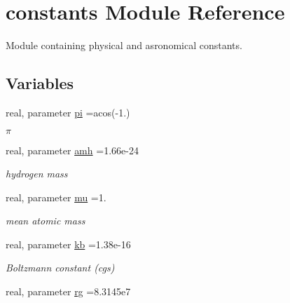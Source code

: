 \hypertarget{namespaceconstants}{}\section{constants Module Reference}
\label{namespaceconstants}


Module containing physical and asronomical constants.  


\subsection*{Variables}
\begin{DoxyCompactItemize}
\item 
\hypertarget{namespaceconstants_a815ad954ef712211ed1b1fdb8be42487}{}real, parameter \hyperlink{namespaceconstants_a815ad954ef712211ed1b1fdb8be42487}{pi} =acos(-\/1.)\label{namespaceconstants_a815ad954ef712211ed1b1fdb8be42487}

\begin{DoxyCompactList}\small\item\em $ \pi $ \end{DoxyCompactList}\item 
\hypertarget{namespaceconstants_aac258d92ad409a5ad7f8748101e932b0}{}real, parameter \hyperlink{namespaceconstants_aac258d92ad409a5ad7f8748101e932b0}{amh} =1.\+66e-\/24\label{namespaceconstants_aac258d92ad409a5ad7f8748101e932b0}

\begin{DoxyCompactList}\small\item\em hydrogen mass \end{DoxyCompactList}\item 
\hypertarget{namespaceconstants_a02d6877af0064a592565cca791e6dfa2}{}real, parameter \hyperlink{namespaceconstants_a02d6877af0064a592565cca791e6dfa2}{mu} =1.\label{namespaceconstants_a02d6877af0064a592565cca791e6dfa2}

\begin{DoxyCompactList}\small\item\em mean atomic mass \end{DoxyCompactList}\item 
\hypertarget{namespaceconstants_afc7b29a52df069e705256c11de562808}{}real, parameter \hyperlink{namespaceconstants_afc7b29a52df069e705256c11de562808}{kb} =1.\+38e-\/16\label{namespaceconstants_afc7b29a52df069e705256c11de562808}

\begin{DoxyCompactList}\small\item\em Boltzmann constant (cgs) \end{DoxyCompactList}\item 
\hypertarget{namespaceconstants_aab4c0a2b0e8b8cda79e9d683b3e650f6}{}real, parameter \hyperlink{namespaceconstants_aab4c0a2b0e8b8cda79e9d683b3e650f6}{rg} =8.\+3145e7\label{namespaceconstants_aab4c0a2b0e8b8cda79e9d683b3e650f6}


\end{DoxyCompactItemize}
